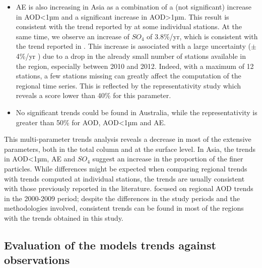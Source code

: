 \documentclass[journal abbreviation, manuscript]{copernicus}
\begin{document}
\begin{itemize}
 \item AE is also increasing in Asia as a combination of a (not significant) increase in AOD<1µm and a significant increase in AOD>1µm. This result is consistent with the trend reported by \cite{yoon2012trend} at some individual stations. At the same time, we observe an increase of $SO_{4}$ of 3.8\%/yr, which is consistent with the trend reported in \cite{aas2019global}. This increase is associated with a large uncertainty ($\pm$4\%/yr ) due to a drop in the already small number of stations available in the region, especially between 2010 and 2012. Indeed, with a maximum of 12 stations, a few stations missing can greatly affect the computation of the regional time series. This is reflected by the representativity study which reveals a score lower than 40\% for this parameter. 
 \item No significant trends could be found in Australia, while the representativity is greater than 50\% for AOD, AOD<1µm and AE.

\end{itemize}

This multi-parameter trends analysis reveals a decrease in most of the extensive parameters, both in the total column and at the surface level. In Asia, the trends in AOD<1µm, AE and $SO_{4}$ suggest an increase in the proportion of the finer particles. While differences might be expected when comparing regional trends with trends computed at individual stations, the trends are usually consistent with those previously reported in the literature.  \cite{DEMEIJ201275} focused on regional AOD trends in the 2000-2009 period; despite the differences in the study periods and the methodologies involved, consistent trends can be found in most of the regions with the trends obtained in this study.

\subsection{Evaluation of the models trends against observations}\label{mod_evaluation}
\end{document}
